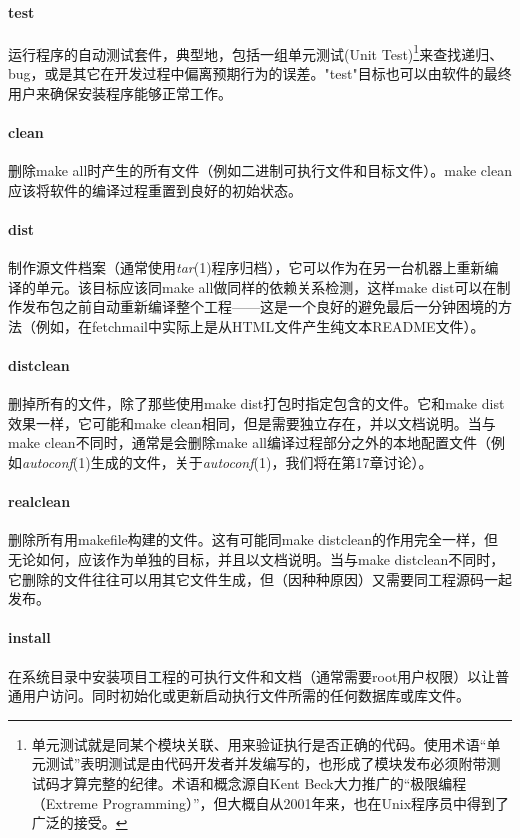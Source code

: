 \documentclass[12pt,oneside]{ctexbook}
\begin{document}
\begin{common-format}
\paragraph{test}
运行程序的自动测试套件，典型地，包括一组单元测试(Unit Test)\footnote{单元测试就是同某个模块关联、用来验证执行是否正确的代码。使用术语“单元测试”表明测试是由代码开发者并发编写的，也形成了模块发布必须附带测试码才算完整的纪律。术语和概念源自Kent Beck大力推广的“极限编程（Extreme Programming）”，但大概自从2001年来，也在Unix程序员中得到了广泛的接受。}来查找递归、bug，或是其它在开发过程中偏离预期行为的误差。"test"目标也可以由软件的最终用户来确保安装程序能够正常工作。

\paragraph{clean}
删除make all时产生的所有文件（例如二进制可执行文件和目标文件）。make clean应该将软件的编译过程重置到良好的初始状态。

\paragraph{dist}
制作源文件档案（通常使用\textit{tar}(1)程序归档），它可以作为在另一台机器上重新编译的单元。该目标应该同make all做同样的依赖关系检测，这样make dist可以在制作发布包之前自动重新编译整个工程——这是一个良好的避免最后一分钟困境的方法（例如，在fetchmail中实际上是从HTML文件产生纯文本README文件）。

\paragraph{distclean}
删掉所有的文件，除了那些使用make dist打包时指定包含的文件。它和make dist效果一样，它可能和make clean相同，但是需要独立存在，并以文档说明。当与make clean不同时，通常是会删除make all编译过程部分之外的本地配置文件（例如\textit{autoconf}(1)生成的文件，关于\textit{autoconf}(1)，我们将在第17章讨论）。

\paragraph{realclean}
删除所有用makefile构建的文件。这有可能同make distclean的作用完全一样，但无论如何，应该作为单独的目标，并且以文档说明。当与make distclean不同时，它删除的文件往往可以用其它文件生成，但（因种种原因）又需要同工程源码一起发布。

\paragraph{install}
在系统目录中安装项目工程的可执行文件和文档（通常需要root用户权限）以让普通用户访问。同时初始化或更新启动执行文件所需的任何数据库或库文件。


\end{common-format}
\end{document}

